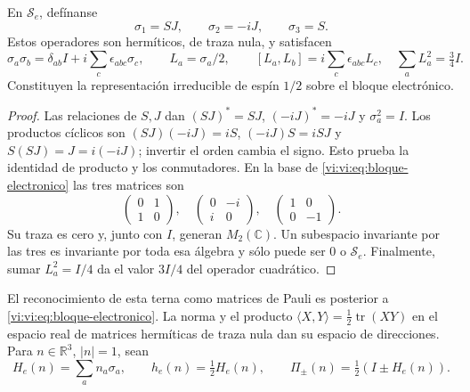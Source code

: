\begin{proposition}
\label{vi:vi:prop:spin}
En $\mathscr S_e$, defínanse
\begin{equation}
 \sigma_1=SJ,\qquad \sigma_2=-iJ,\qquad \sigma_3=S.
 \label{vi:vi:eq:terna}
\end{equation}
Estos operadores son hermíticos, de traza nula, y satisfacen
\begin{equation}
 \sigma_a\sigma_b=\delta_{ab}I+
 i\sum_c\epsilon_{abc}\sigma_c,
 \qquad L_a=\sigma_a/2,\qquad
 [L_a,L_b]=i\sum_c\epsilon_{abc}L_c,
 \quad\sum_aL_a^2=\tfrac34I.
 \label{vi:vi:eq:spin-algebra}
\end{equation}
Constituyen la representación irreducible de espín $1/2$ sobre
el bloque electrónico.
\end{proposition}
\begin{proof}
Las relaciones de $S,J$ dan $(SJ)^*=SJ$, $(-iJ)^*=-iJ$ y
$\sigma_a^2=I$. Los productos cíclicos son
$(SJ)(-iJ)=iS$, $(-iJ)S=iSJ$ y $S(SJ)=J=i(-iJ)$;
invertir el orden cambia el signo. Esto prueba la identidad de
producto y los conmutadores. En la base de
\eqref{vi:vi:eq:bloque-electronico} las tres matrices son
\[
 \begin{pmatrix}0&1\\1&0\end{pmatrix},\quad
 \begin{pmatrix}0&-i\\i&0\end{pmatrix},\quad
 \begin{pmatrix}1&0\\0&-1\end{pmatrix}.
\]
Su traza es cero y, junto con $I$, generan $M_2(\mathbb C)$.
Un subespacio invariante por las tres es invariante por toda esa
álgebra y sólo puede ser $0$ o $\mathscr S_e$. Finalmente,
sumar $L_a^2=I/4$ da el valor $3I/4$ del operador cuadrático.
\end{proof}

El reconocimiento de esta terna como matrices de Pauli es posterior
a \eqref{vi:vi:eq:bloque-electronico}. La norma y el producto
$\langle X,Y\rangle=\tfrac12\operatorname{tr}(XY)$ en el
espacio real de matrices hermíticas de traza nula dan su espacio
de direcciones. Para $n\in\mathbb R^3$, $|n|=1$, sean
\begin{equation}
 H_e(n)=\sum_an_a\sigma_a,\qquad
 h_e(n)=\tfrac12H_e(n),\qquad
 \Pi_\pm(n)=\tfrac12(I\pm H_e(n)).
 \label{vi:vi:eq:helicidad}
\end{equation}

